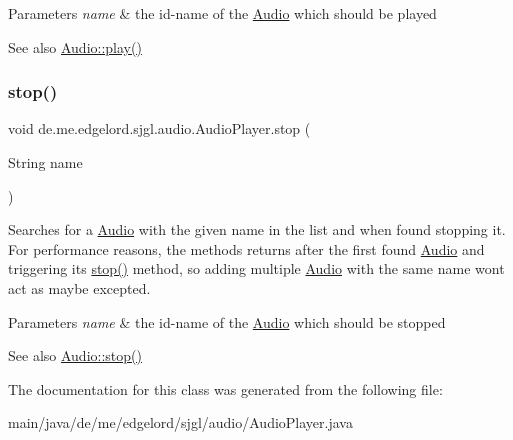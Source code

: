 \begin{DoxyParams}{Parameters}
{\em name} & the id-\/name of the {\ttfamily \mbox{\hyperlink{classde_1_1me_1_1edgelord_1_1sjgl_1_1audio_1_1_audio}{Audio}}} which should be played\\
\hline
\end{DoxyParams}
\begin{DoxySeeAlso}{See also}
\mbox{\hyperlink{classde_1_1me_1_1edgelord_1_1sjgl_1_1audio_1_1_audio_ac87651401394ee2e141c099a175cd7cb}{Audio\+::play()}} 
\end{DoxySeeAlso}
\mbox{\label{classde_1_1me_1_1edgelord_1_1sjgl_1_1audio_1_1_audio_player_a52bd650d815c823dc0a5e99b4aeba927}} 
\subsubsection{\texorpdfstring{stop()}{stop()}}
{\footnotesize\ttfamily void de.\+me.\+edgelord.\+sjgl.\+audio.\+Audio\+Player.\+stop (\begin{DoxyParamCaption}\item[{String}]{name }\end{DoxyParamCaption})}

Searches for a {\ttfamily \mbox{\hyperlink{classde_1_1me_1_1edgelord_1_1sjgl_1_1audio_1_1_audio}{Audio}}} with the given name in the list and when found stopping it. For performance reasons, the methods returns after the first found {\ttfamily \mbox{\hyperlink{classde_1_1me_1_1edgelord_1_1sjgl_1_1audio_1_1_audio}{Audio}}} and triggering its {\ttfamily \mbox{\hyperlink{classde_1_1me_1_1edgelord_1_1sjgl_1_1audio_1_1_audio_player_a52bd650d815c823dc0a5e99b4aeba927}{stop()}}} method, so adding multiple {\ttfamily \mbox{\hyperlink{classde_1_1me_1_1edgelord_1_1sjgl_1_1audio_1_1_audio}{Audio}}} with the same name won\textquotesingle{}t act as maybe excepted.


\begin{DoxyParams}{Parameters}
{\em name} & the id-\/name of the {\ttfamily \mbox{\hyperlink{classde_1_1me_1_1edgelord_1_1sjgl_1_1audio_1_1_audio}{Audio}}} which should be stopped\\
\hline
\end{DoxyParams}
\begin{DoxySeeAlso}{See also}
\mbox{\hyperlink{classde_1_1me_1_1edgelord_1_1sjgl_1_1audio_1_1_audio_a2e9d9c2e43c4bab399c7f360c8f90ce2}{Audio\+::stop()}} 
\end{DoxySeeAlso}


The documentation for this class was generated from the following file\+:\begin{DoxyCompactItemize}
\item 
main/java/de/me/edgelord/sjgl/audio/Audio\+Player.\+java\end{DoxyCompactItemize}
